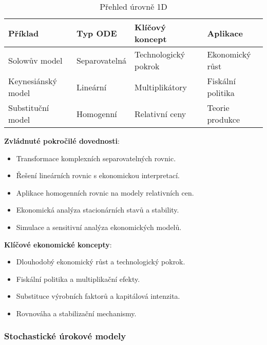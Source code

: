 \begin{table}[h]
\centering
\caption{Přehled úrovně 1D}
\label{tab:prehled-1d}
\begin{tabular}{@{}llll@{}}
\toprule
\textbf{Příklad} & \textbf{Typ ODE} & \textbf{Klíčový koncept} & \textbf{Aplikace} \\
\midrule
Solowův model & Separovatelná & Technologický pokrok & Ekonomický růst \\
Keynesiánský model & Lineární & Multiplikátory & Fiskální politika \\
Substituční model & Homogenní & Relativní ceny & Teorie produkce \\
\bottomrule
\end{tabular}
\end{table}

\noindent\textbf{Zvládnuté pokročilé dovednosti}:
\begin{itemize}
\item Transformace komplexních separovatelných rovnic.
\item Řešení lineárních rovnic s ekonomickou interpretací.
\item Aplikace homogenních rovnic na modely relativních cen.
\item Ekonomická analýza stacionárních stavů a stability.
\item Simulace a sensitivní analýza ekonomických modelů.
\end{itemize}

\noindent\textbf{Klíčové ekonomické koncepty}:
\begin{itemize}
\item Dlouhodobý ekonomický růst a technologický pokrok.
\item Fiskální politika a multiplikační efekty.
\item Substituce výrobních faktorů a kapitálová intenzita.
\item Rovnováha a stabilizační mechanismy.
\end{itemize}

\label{sec:uroven-1d}

\subsubsection{Stochastické úrokové modely}
\label{subsec:stochasticke-urokove-modely}

